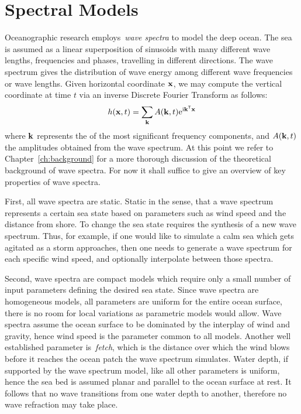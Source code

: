 \section{Spectral Models}
%
Oceanographic research employs~\emph{wave spectra} to model the deep ocean. The
sea is assumed as a linear superposition of sinusoids with many different wave
lengths, frequencies and phases, travelling in different directions. The wave
spectrum gives the distribution of wave energy among different wave frequencies
or wave lengths. Given horizontal coordinate $\mathbf{x}$, we may compute the
vertical coordinate at time $t$ via an inverse Discrete Fourier Transform as
follows:
\begin{equation}
h(\mathbf{x},t) = \sum_{\mathbf{k}}A(\mathbf{k},t)\mathrm{e}^{\mathrm{i}\mathbf{k}^{\mathsf{T}}\mathbf{x}}
\label{eq:spectral_models}
\end{equation}
where $\mathbf{k}$ represents the \wavevectors of the most significant frequency
components, and $A(\mathbf{k},t)$ the amplitudes obtained from the wave
spectrum.
At this point we refer to Chapter~\ref{ch:background} for a more thorough
discussion of the theoretical background of wave spectra.
For now it shall suffice to give an overview of key properties of wave spectra. 

First, all wave spectra
are static. Static in the sense, that a wave spectrum represents a certain sea
state based on parameters such as wind speed and the distance from shore. To
change the sea state requires the synthesis of a new wave spectrum. Thus, for
example, if one would like to simulate a calm sea which gets agitated as a storm
approaches, then one needs to generate a wave spectrum for each specific wind
speed, and optionally interpolate between those spectra.

Second, wave spectra are compact models which require only a small
number of input parameters defining the desired sea state. Since wave spectra
are homogeneous models, all parameters are uniform for the entire ocean surface,
there is no room for local variations as parametric models would allow. Wave
spectra assume the ocean surface to be dominated by the interplay of wind and
gravity, hence wind speed is the parameter common to all models. Another well
established parameter is~\emph{fetch}, which is the distance over which the wind
blows before it reaches the ocean patch the wave spectrum simulates. Water
depth, if supported by the wave spectrum model, like all other parameters is
uniform, hence the sea bed is assumed planar and parallel to the ocean surface
at rest. It follows that no wave transitions from one water depth to another,
therefore no wave refraction may take place.

